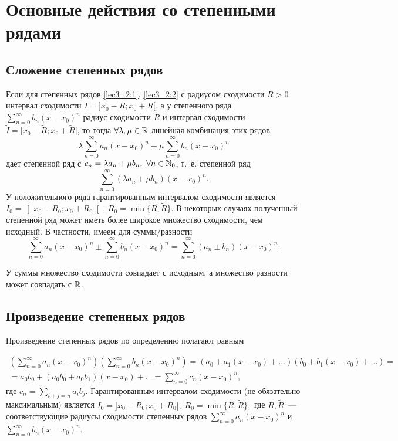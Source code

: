 \documentclass[../../main.tex]{subfiles}
\begin{document}
    \section{Основные действия со степенными рядами}
    \subsection{Сложение степенных рядов}
    
    Если для степенных рядов \eqref{lec3_2:1}, \eqref{lec3_2:2}  с радиусом 
    сходимости $R > 0$ интервал сходимости $I = ]x_0-R; x_0 + R[$, а у 
    степенного ряда $\sum\limits_{n = 0}^{\infty} b_n(x-x_0)^n$ радиус 
    сходимости $\widetilde R$ и интервал сходимости $\widetilde I = 
    ]x_0-\widetilde R; x_0 + \widetilde R[$, то тогда $\forall \lambda, \mu 
    \in 
    \mathbb{R}$ линейная комбинация этих рядов
    \[\lambda \sum\limits_{n = 0}^{\infty}a_n(x-x_0)^n + \mu 
    \sum\limits_{n = 0}^{\infty} b_n(x-x_0)^n \]
    даёт степенной ряд с $c_n = \lambda a_n + \mu b_n, \  \forall n \in 
    \mathbb{N}_0$, т.~е. степенной ряд
    \[ \sum\limits_{n = 0}^{\infty}(\lambda a_n + \mu b_n)(x-x_0)^n. \]
    У положительного ряда гарантированным интервалом сходимости является 
    $I_0 = \left]x_0-R_0; x_0 + R_0\right[$, $R_0 = \min \{R, \widetilde R\}$. 
    В 
    некоторых случаях полученный степенной ряд может иметь более широкое 
    множество сходимости, чем исходный. В частности, имеем для суммы/разности
    \[ \sum\limits_{n = 0}^{\infty}a_n(x-x_0)^n \pm 
    \sum\limits_{n = 0}^{\infty}b_n(x-x_0)^n = 
    \sum\limits_{n = 0}^{\infty}(a_n \pm b_n) (x-x_0)^n.  \]

    У суммы множество сходимости совпадает с исходным, а множество разности 
    может совпадать с $\mathbb{R}$.
    
    \subsection{Произведение степенных рядов}
    Произведение степенных рядов по определению полагают равным

    \begin{multline*}
        \left( \sum\limits_{n = 0}^{\infty}a_n(x-x_0)^n \right)
        \left( \sum\limits_{n = 0}^{\infty}b_n(x-x_0)^n \right) = 
        (a_0 + a_1(x - x_0) + \ldots)(b_0 + b_1(x - x_0) + \ldots) =
        \\ = a_0b_0 + (a_0b_0 + a_0b_1)(x - x_0) + \ldots = 
        \sum\limits_{n = 0}^{\infty}c_n(x-x_0)^n, 
    \end{multline*}
    где $c_n = \sum\limits_{i + j = n} a_ib_j$. Гарантированным интервалом 
    сходимости (не обязательно максимальным) является $I_0 = ]x_0-R_0; x_0 + 
    R_0[, \; R_0 = \min \{R, \widetilde R\},$ где $R, \widetilde R$~--- 
    соответствующие радиусы сходимости степенных рядов $\sum\limits_{n = 0}^
    {\infty}a_n(x-x_0)^n$ и $\sum\limits_{n = 0}^{\infty}b_n(x-x_0)^n$.
    
\end{document}
